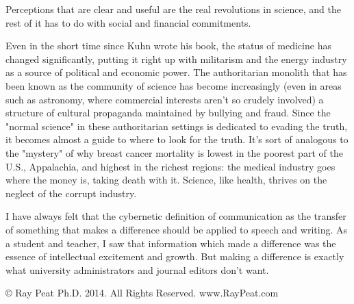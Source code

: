 \documentclass{article}
\begin{document}
Perceptions that are clear and useful are the real revolutions in science, and the rest of it has to do with social and financial commitments.

Even in the short time since Kuhn wrote his book, the status of medicine has changed significantly, putting it right up with militarism and the energy industry as a source of political and economic power. The authoritarian monolith that has been known as the community of science has become increasingly (even in areas such as astronomy, where commercial interests aren't so crudely involved) a structure of cultural propaganda maintained by bullying and fraud. Since the "normal science" in these authoritarian settings is dedicated to evading the truth, it becomes almost a guide to where to look for the truth. It's sort of analogous to the "mystery" of why breast cancer mortality is lowest in the poorest part of the U.S., Appalachia, and highest in the richest regions: the medical industry goes where the money is, taking death with it. Science, like health, thrives on the neglect of the corrupt industry.

I have always felt that the cybernetic definition of communication as the transfer of something that makes a difference should be applied to speech and writing. As a student and teacher, I saw that information which made a difference was the essence of intellectual excitement and growth. But making a difference is exactly what university administrators and journal editors don't want.

\vspace{1em} %
\noindent © Ray Peat Ph.D. 2014. All Rights Reserved. www.RayPeat.com
\end{document}
